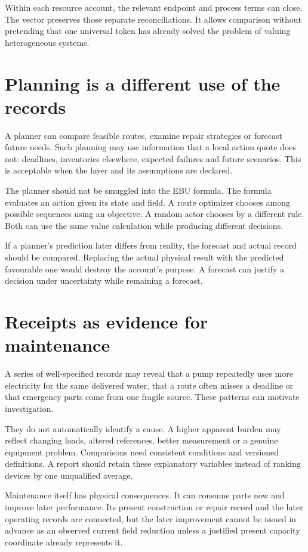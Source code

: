 Within each resource account, the relevant endpoint and process terms can close. The vector preserves those separate reconciliations. It allows comparison without pretending that one universal token has already solved the problem of valuing heterogeneous systems.

\section{Planning is a different use of the records}
A planner can compare feasible routes, examine repair strategies or forecast future needs. Such planning may use information that a local action quote does not: deadlines, inventories elsewhere, expected failures and future scenarios. This is acceptable when the layer and its assumptions are declared.

The planner should not be smuggled into the EBU formula. The formula evaluates an action given its state and field. A route optimizer chooses among possible sequences using an objective. A random actor chooses by a different rule. Both can use the same value calculation while producing different decisions.

If a planner's prediction later differs from reality, the forecast and actual record should be compared. Replacing the actual physical result with the predicted favourable one would destroy the account's purpose. A forecast can justify a decision under uncertainty while remaining a forecast.

\section{Receipts as evidence for maintenance}
A series of well-specified records may reveal that a pump repeatedly uses more electricity for the same delivered water, that a route often misses a deadline or that emergency parts come from one fragile source. These patterns can motivate investigation.

They do not automatically identify a cause. A higher apparent burden may reflect changing loads, altered references, better measurement or a genuine equipment problem. Comparisons need consistent conditions and versioned definitions. A report should retain these explanatory variables instead of ranking devices by one unqualified average.

Maintenance itself has physical consequences. It can consume parts now and improve later performance. Its present construction or repair record and the later operating records are connected, but the later improvement cannot be issued in advance as an observed current field reduction unless a justified present capacity coordinate already represents it.


